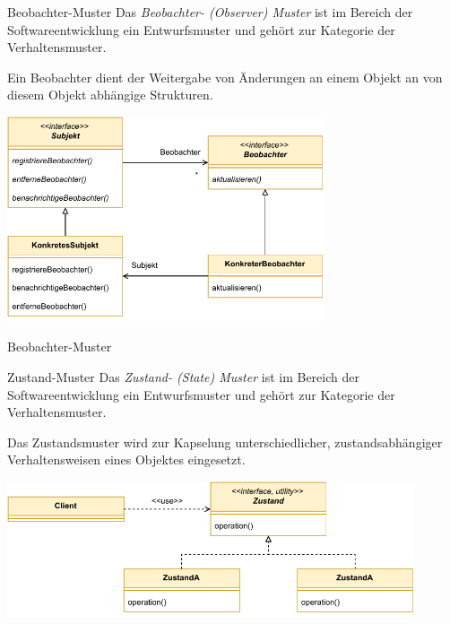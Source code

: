 \begin{defi}{Beobachter-Muster}
    Das \emph{Beobachter- (Observer) Muster} ist im Bereich der Softwareentwicklung ein Entwurfsmuster und gehört zur Kategorie der Verhaltensmuster.

    Ein Beobachter dient der Weitergabe von Änderungen an einem Objekt an von diesem Objekt abhängige Strukturen.

    \begin{center}
        \includegraphics[width=0.7\textwidth]{includes/figures/defi_beobachter.pdf}
    \end{center}
\end{defi}

\begin{example}{Beobachter-Muster}
    

    

    
\end{example}

\begin{defi}{Zustand-Muster}
    Das \emph{Zustand- (State) Muster} ist im Bereich der Softwareentwicklung ein Entwurfsmuster und gehört zur Kategorie der Verhaltensmuster.

    Das Zustandsmuster wird zur Kapselung unterschiedlicher, zustandsabhängiger Verhaltensweisen eines Objektes eingesetzt.

    \begin{center}
        \includegraphics[width=0.9\textwidth]{includes/figures/defi_zustand.pdf}
    \end{center}
\end{defi}

